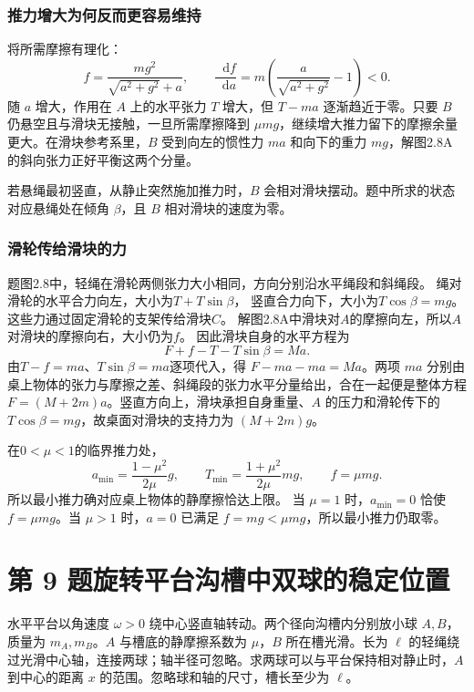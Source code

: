 \documentclass[UTF8,fontset=fandol,a4paper,11pt]{ctexart}
\newcommand{\dd}{\mathop{}\!\mathrm{d}}
\newcommand{\tagline}[1]{\noindent{\small\color{muted}#1}\par}
\begin{document}
\subsubsection*{推力增大为何反而更容易维持}
将所需摩擦有理化：
\[
f=\frac{mg^2}{\sqrt{a^2+g^2}+a},\qquad
\frac{\dd f}{\dd a}=m\left(\frac a{\sqrt{a^2+g^2}}-1\right)<0.
\]
随 $a$ 增大，作用在 $A$ 上的水平张力 $T$ 增大，但 $T-ma$ 逐渐趋近于零。只要 $B$ 仍悬空且与滑块无接触，一旦所需摩擦降到 $\mu mg$，继续增大推力留下的摩擦余量更大。在滑块参考系里，$B$ 受到向左的惯性力 $ma$ 和向下的重力 $mg$，解图2.8A 的斜向张力正好平衡这两个分量。

若悬绳最初竖直，从静止突然施加推力时，$B$ 会相对滑块摆动。题中所求的状态对应悬绳处在倾角 $\beta$，且 $B$ 相对滑块的速度为零。
\subsubsection*{滑轮传给滑块的力}
题图2.8中，轻绳在滑轮两侧张力大小相同，方向分别沿水平绳段和斜绳段。
绳对滑轮的水平合力向左，大小为$T+T\sin\beta$，
竖直合力向下，大小为$T\cos\beta=mg$。
这些力通过固定滑轮的支架传给滑块$C$。
解图2.8A中滑块对$A$的摩擦向左，所以$A$对滑块的摩擦向右，大小仍为$f$。
因此滑块自身的水平方程为
\[
F+f-T-T\sin\beta=Ma.
\]
由$T-f=ma$、$T\sin\beta=ma$逐项代入，得
$F-ma-ma=Ma$。两项 $ma$ 分别由桌上物体的张力与摩擦之差、斜绳段的张力水平分量给出，合在一起便是整体方程 $F=(M+2m)a$。竖直方向上，滑块承担自身重量、$A$ 的压力和滑轮传下的 $T\cos\beta=mg$，故桌面对滑块的支持力为 $(M+2m)g$。

在$0<\mu<1$的临界推力处，
\[
a_{\min}=\frac{1-\mu^2}{2\mu}g,\qquad
T_{\min}=\frac{1+\mu^2}{2\mu}mg,\qquad f=\mu mg.
\]
所以最小推力确对应桌上物体的静摩擦恰达上限。
当 $\mu=1$ 时，$a_{\min}=0$ 恰使 $f=\mu mg$。当 $\mu>1$ 时，$a=0$ 已满足 $f=mg<\mu mg$，所以最小推力仍取零。




\section*{第 9 题\quad 旋转平台沟槽中双球的稳定位置}

\tagline{M-02-09}

水平平台以角速度 $\omega>0$ 绕中心竖直轴转动。两个径向沟槽内分别放小球 $A,B$，质量为 $m_A,m_B$。$A$ 与槽底的静摩擦系数为 $\mu$，$B$ 所在槽光滑。长为 $\ell$ 的轻绳绕过光滑中心轴，连接两球；轴半径可忽略。求两球可以与平台保持相对静止时，$A$ 到中心的距离 $x$ 的范围。忽略球和轴的尺寸，槽长至少为 $\ell$。
\end{document}
